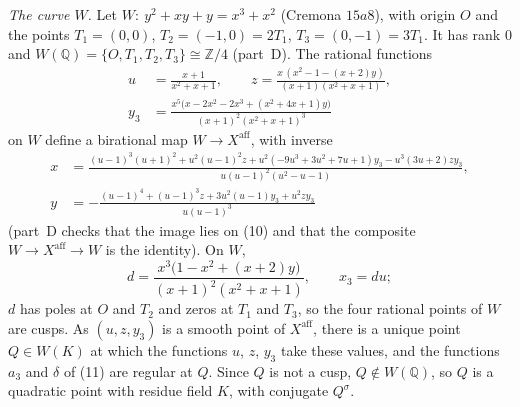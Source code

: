 \documentclass[11pt]{article}
\newcommand{\Q}{\mathbb Q}
\newcommand{\Z}{\mathbb Z}
\begin{document}
\emph{The curve \(W\).} Let \(W:\ y^2+xy+y=x^3+x^2\) (Cremona \(15a8\)), with origin \(O\) and the
points \(T_1=(0,0)\), \(T_2=(-1,0)=2T_1\), \(T_3=(0,-1)=3T_1\). It has rank \(0\) and
\(W(\Q)=\{O,T_1,T_2,T_3\}\cong\Z/4\) (part~D). The rational functions
\[\begin{aligned}
u&=\frac{x+1}{x^2+x+1},\qquad z=\frac{x\,(x^2-1-(x+2)y)}{(x+1)(x^2+x+1)},\\
y_3&=\frac{x^5\bigl(x-2x^2-2x^3+(x^2+4x+1)y\bigr)}{(x+1)^2(x^2+x+1)^3}
\end{aligned}\]
on \(W\) define a birational map \(W\to X^{\mathrm{aff}}\), with inverse
\[\begin{aligned}
x&=\frac{(u-1)^3(u+1)^2+u^2(u-1)^2z+u^2(-9u^3+3u^2+7u+1)y_3-u^3(3u+2)zy_3}{u(u-1)^2(u^2-u-1)},\\
y&=-\frac{(u-1)^4+(u-1)^3z+3u^2(u-1)y_3+u^2zy_3}{u(u-1)^3}
\end{aligned}\]
(part~D checks that the image lies on (10) and that the composite \(W\to X^{\mathrm{aff}}\to W\) is the
identity). On \(W\),
\[d=\frac{x^3\bigl(1-x^2+(x+2)y\bigr)}{(x+1)^2(x^2+x+1)},\qquad x_3=du;\]
\(d\) has poles at \(O\) and \(T_2\) and zeros at \(T_1\) and \(T_3\), so the four rational points of
\(W\) are cusps. As \((u,z,y_3)\) is a smooth point of \(X^{\mathrm{aff}}\), there is a unique point
\(Q\in W(K)\) at which the functions \(u\), \(z\), \(y_3\) take these values, and the functions
\(a_3\) and \(\delta\) of (11) are regular at \(Q\). Since \(Q\) is not a cusp, \(Q\notin W(\Q)\), so
\(Q\) is a quadratic point with residue field \(K\), with conjugate \(Q^\sigma\).
\end{document}
